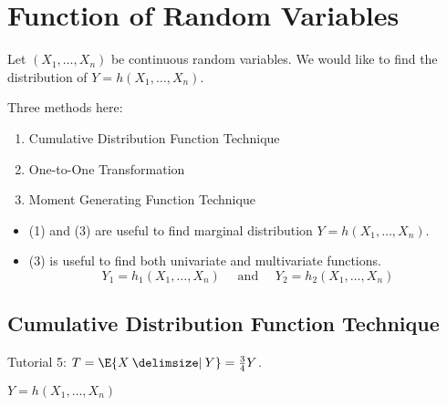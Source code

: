 \chapter{Function of Random Variables}
Let $ (X_1,\ldots,X_n) $ be continuous random
variables. We would like to find the distribution
of $ Y=h(X_1,\ldots,X_n) $.

Three methods here:
\begin{enumerate}[label=(\arabic*)]
    \item Cumulative Distribution Function Technique
    \item One-to-One Transformation
    \item Moment Generating Function Technique
\end{enumerate}
\begin{itemize}
    \item (1) and (3) are useful to find marginal distribution
          $ Y=h(X_1,\ldots,X_n) $.
    \item (3) is useful to find both univariate and multivariate
          functions.
          \[ Y_1=h_1(X_1,\ldots,X_n)\quad\text{ and }\quad Y_2=h_2(X_1,\ldots,X_n) \]
\end{itemize}
\section{Cumulative Distribution Function Technique}
Tutorial 5: $ T=\E{X\given Y}=\frac{3}{4} Y $.

$ Y=h(X_1,\ldots,X_n) $

